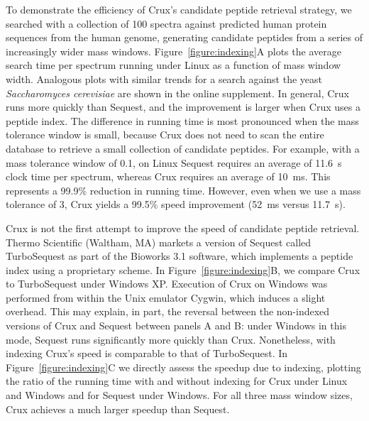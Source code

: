 \documentclass[12pt]{article}
\begin{document}
% 
%
% 
% 
% 
% 

To demonstrate the efficiency of Crux's candidate peptide retrieval
strategy, we searched with a collection of 100 spectra against
predicted human protein sequences from the human genome, generating
candidate peptides from a series of increasingly wider mass windows.
Figure~\ref{figure:indexing}A plots the average search time per spectrum 
running under
Linux as a function of mass window width. Analogous plots with similar
trends for a search against the yeast {\em Saccharomyces cerevisiae}
are shown in the online supplement.  In general, Crux runs more
quickly than {\sc Sequest}, and the improvement is larger when Crux
uses a peptide index.  The difference in running time is most
pronounced when the mass tolerance window is small, because Crux does
not need to scan the entire database to retrieve a small collection of
candidate peptides.  For example, with a mass tolerance window of 0.1,
on Linux {\sc Sequest} 
requires an average of 11.6~s clock time per spectrum, whereas Crux requires
an average of 10~ms. 
This represents a 99.9\% reduction in running time. However,
even when we use a mass tolerance of 3, Crux yields a 99.5\% speed
improvement (52~ms versus 11.7~s).

Crux is not the first attempt to improve the speed of candidate
peptide retrieval.  Thermo Scientific (Waltham, MA) markets a version
of {\sc Sequest} called Turbo{\sc Sequest} as part of the Bioworks 3.1
software, which implements a peptide index using a proprietary scheme.
In Figure~\ref{figure:indexing}B, we compare Crux to Turbo{\sc Sequest}
under Windows XP.  Execution of Crux on Windows was performed from
within the Unix emulator Cygwin, which induces a slight overhead.
This may explain, in part, the reversal between the non-indexed
versions of Crux and {\sc Sequest} between panels A and B: under
Windows in this mode, {\sc Sequest} runs significantly more quickly
than Crux.  Nonetheless, with indexing Crux's speed is comparable to
that of Turbo{\sc Sequest}.  In Figure~\ref{figure:indexing}C we directly
assess the speedup due to indexing, plotting the ratio of the running
time with and without indexing for Crux under Linux and Windows and
for {\sc Sequest} under Windows.  For all three mass window sizes,
Crux achieves a much larger speedup than {\sc Sequest}.
\end{document}
